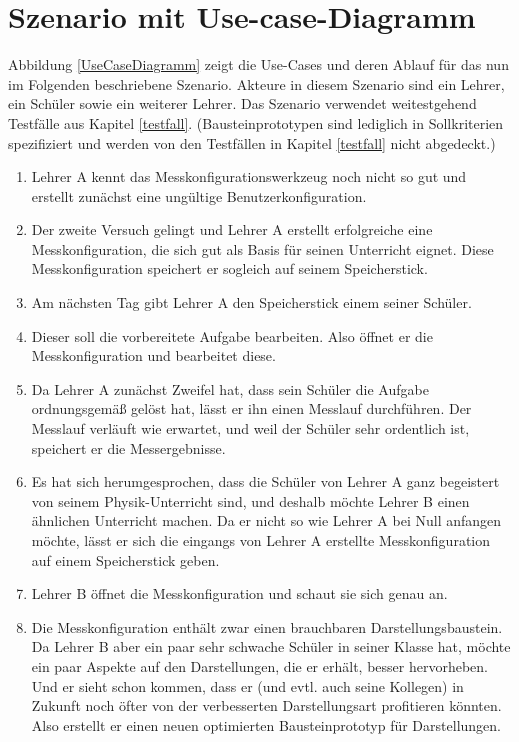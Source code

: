 \documentclass[parskip=full]{scrartcl}
\begin{document}
\section{Szenario mit Use-case-Diagramm}\label{scenario}

Abbildung \ref{UseCaseDiagramm} zeigt die Use-Cases und deren Ablauf für das nun im Folgenden beschriebene Szenario. Akteure in diesem Szenario sind ein Lehrer, ein Schüler sowie ein weiterer Lehrer. Das Szenario verwendet weitestgehend Testfälle aus Kapitel \ref{testfall}. (Bausteinprototypen sind lediglich in Sollkriterien spezifiziert und werden von den Testfällen in Kapitel \ref{testfall} nicht abgedeckt.)

\begin{enumerate}
	\item Lehrer A kennt das Messkonfigurationswerkzeug noch nicht so gut und erstellt zunächst eine ungültige \gls{Benutzerkonfiguration}. 
	
	\item Der zweite Versuch gelingt und Lehrer A erstellt erfolgreiche eine Messkonfiguration, die sich gut als Basis für seinen Unterricht eignet. Diese Messkonfiguration speichert er sogleich auf seinem Speicherstick.
	
	\item Am nächsten Tag gibt Lehrer A den Speicherstick einem seiner Schüler. 
	
	\item Dieser soll die vorbereitete Aufgabe bearbeiten. Also öffnet er die Messkonfiguration und bearbeitet diese.
	
	\item Da Lehrer A zunächst Zweifel hat, dass sein Schüler die Aufgabe ordnungsgemäß gelöst hat, lässt er ihn einen Messlauf durchführen. Der Messlauf verläuft wie erwartet, und weil der Schüler sehr ordentlich ist, speichert er die Messergebnisse.
	
	\item Es hat sich herumgesprochen, dass die Schüler von Lehrer A ganz begeistert von seinem Physik-Unterricht sind, und deshalb möchte Lehrer B einen ähnlichen Unterricht machen. Da er nicht so wie Lehrer A bei Null anfangen möchte, lässt er sich die eingangs von Lehrer A erstellte Messkonfiguration auf einem Speicherstick geben. 
	
	\item Lehrer B öffnet die Messkonfiguration und schaut sie sich genau an.
	
	\item Die Messkonfiguration enthält zwar einen brauchbaren Darstellungsbaustein. Da Lehrer B aber ein paar sehr schwache Schüler in seiner Klasse hat, möchte ein paar Aspekte auf den Darstellungen, die er erhält, besser hervorheben. Und er sieht schon kommen, dass er (und evtl. auch seine Kollegen) in Zukunft noch öfter von der verbesserten Darstellungsart profitieren könnten. Also erstellt er einen neuen optimierten Bausteinprototyp für Darstellungen.
	

\end{enumerate}
\end{document}
